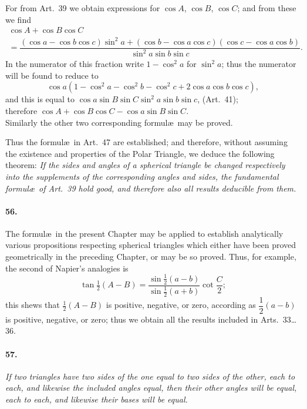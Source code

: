 \documentclass{book}[2004/02/16]
\begin{document}
\begin{mainmatter}
\begin{spacing}{1.3}
For from Art.~39 we obtain expressions for $\cos A$, $\cos B$, $\cos C$;
and from these we find
\begin{multline*}
\cos A + \cos B \cos C \\
= \dfrac{(\cos a - \cos b \cos c) \sin^2 a + (\cos b - \cos a \cos c)(\cos c - \cos a \cos b)}
{\sin^2 a \sin b \sin c}.
\end{multline*}
In the numerator of this fraction write $1 - \cos^2 a$ for $\sin^2 a$; thus
the numerator will be found to reduce to
\[
\cos a (1 - \cos^2 a - \cos^2 b - \cos^2 c + 2\cos a \cos b \cos c),
\]
and this is equal to $\cos a \sin B \sin C \sin^2 a \sin b \sin c$, (Art.~41);\\
therefore \hfill $\cos A + \cos B \cos C - \cos a \sin B \sin C$.
\hfill\phantom{therefore}\\
Similarly the other two corresponding formul\ae\ may be proved.

Thus the formul\ae\ in Art.~47 are established; and therefore,
without assuming the existence and properties of the Polar Triangle,
we deduce the following theorem: \textit{If the sides and angles
of a spherical triangle be changed respectively into the supplements
of the corresponding angles and sides, the fundamental formul\ae\ of
Art.~39 hold good, and therefore also all results deducible from them.}

\paragraph{56.} The formul\ae\ in the present Chapter may be applied to
establish analytically various propositions respecting spherical triangles
which either have been proved geometrically in the preceding
Chapter, or may be so proved. Thus, for example, the
second of Napier's analogies is
\[
\tan \tfrac{1}{2}(A-B) =
\dfrac{\sin\tfrac{1}{2}(a-b)}{\sin\tfrac{1}{2}(a+b)}
\cot\dfrac{C}{2};
\]
this shews that $\tfrac{1}{2}(A - B)$ is positive, negative, or zero, according
as $\dfrac{1}{2}(a - b)$ is positive, negative, or zero; thus we obtain all the
results included in Arts.~33\ldots36.

\paragraph{57.} \textit{If two triangles have two sides of the one equal to two
sides of the other, each to each, and likewise the included angles
equal, then their other angles will be equal, each to each, and likewise
their bases will be equal.}


\end{spacing}
\end{mainmatter}
\end{document}
